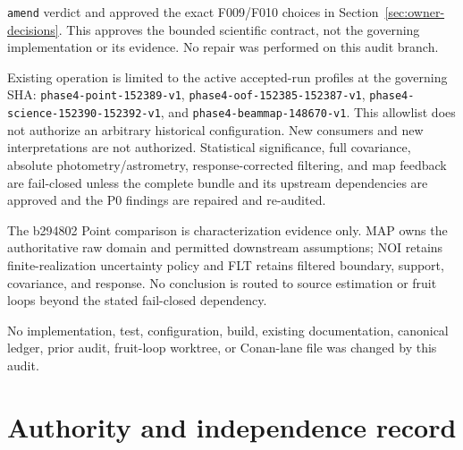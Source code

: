 \documentclass[11pt]{article}
\newcommand{\code}[1]{\nolinkurl{#1}}
\begin{document}
\begin{description}[style=nextline]
\texttt{amend} verdict and approved the exact F009/F010 choices in
Section~\ref{sec:owner-decisions}.  This approves the bounded scientific
contract, not the governing implementation or its evidence.  No repair was
performed on this audit branch.
\item[Consumer policy] Existing operation is limited to the active accepted-run
profiles at the governing SHA: \code{phase4-point-152389-v1},
\code{phase4-oof-152385-152387-v1},
\code{phase4-science-152390-152392-v1}, and
\code{phase4-beammap-148670-v1}.  This allowlist does not authorize an arbitrary
historical configuration.  New consumers and new interpretations are not
authorized.  Statistical significance, full covariance, absolute
photometry/astrometry, response-corrected filtering, and map feedback are
fail-closed unless the complete bundle and its upstream dependencies are
approved and the P0 findings are repaired and re-audited.
\item[Cross-audit routing] The b294802 Point comparison is characterization
evidence only.  MAP owns the authoritative raw domain and permitted downstream
assumptions; NOI retains finite-realization uncertainty policy and FLT retains
filtered boundary, support, covariance, and response.  No conclusion is routed
to source estimation or fruit loops beyond the stated fail-closed dependency.
\end{description}

No implementation, test, configuration, build, existing documentation,
canonical ledger, prior audit, fruit-loop worktree, or Conan-lane file was
changed by this audit.

\section{Authority and independence record}
\end{document}
